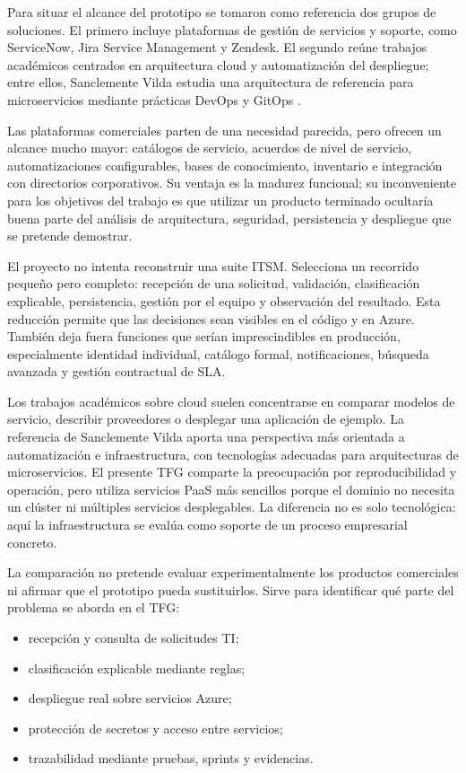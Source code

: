 
Para situar el alcance del prototipo se tomaron como referencia dos grupos de soluciones. El primero incluye plataformas de gestión de servicios y soporte, como ServiceNow, Jira Service Management y Zendesk. El segundo reúne trabajos académicos centrados en arquitectura cloud y automatización del despliegue; entre ellos, Sanclemente Vilda estudia una arquitectura de referencia para microservicios mediante prácticas DevOps y GitOps \cite{sanclemente2024_tfg}.

Las plataformas comerciales parten de una necesidad parecida, pero ofrecen un alcance mucho mayor: catálogos de servicio, acuerdos de nivel de servicio, automatizaciones configurables, bases de conocimiento, inventario e integración con directorios corporativos. Su ventaja es la madurez funcional; su inconveniente para los objetivos del trabajo es que utilizar un producto terminado ocultaría buena parte del análisis de arquitectura, seguridad, persistencia y despliegue que se pretende demostrar.

El proyecto no intenta reconstruir una suite ITSM. Selecciona un recorrido pequeño pero completo: recepción de una solicitud, validación, clasificación explicable, persistencia, gestión por el equipo y observación del resultado. Esta reducción permite que las decisiones sean visibles en el código y en Azure. También deja fuera funciones que serían imprescindibles en producción, especialmente identidad individual, catálogo formal, notificaciones, búsqueda avanzada y gestión contractual de SLA.

Los trabajos académicos sobre cloud suelen concentrarse en comparar modelos de servicio, describir proveedores o desplegar una aplicación de ejemplo. La referencia de Sanclemente Vilda aporta una perspectiva más orientada a automatización e infraestructura, con tecnologías adecuadas para arquitecturas de microservicios. El presente TFG comparte la preocupación por reproducibilidad y operación, pero utiliza servicios PaaS más sencillos porque el dominio no necesita un clúster ni múltiples servicios desplegables. La diferencia no es solo tecnológica: aquí la infraestructura se evalúa como soporte de un proceso empresarial concreto.

La comparación no pretende evaluar experimentalmente los productos comerciales ni afirmar que el prototipo pueda sustituirlos. Sirve para identificar qué parte del problema se aborda en el TFG:

\begin{itemize}
    \item recepción y consulta de solicitudes TI;
    \item clasificación explicable mediante reglas;
    \item despliegue real sobre servicios Azure;
    \item protección de secretos y acceso entre servicios;
    \item trazabilidad mediante pruebas, sprints y evidencias.
\end{itemize}


